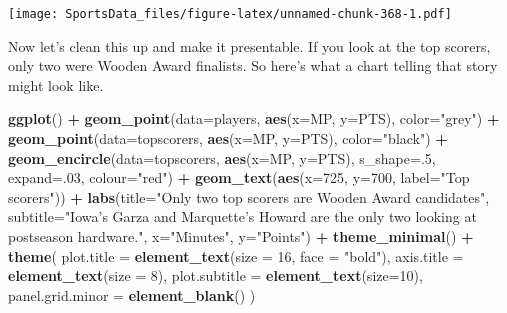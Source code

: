 \documentclass[
]{book}
\newenvironment{Shaded}{\begin{snugshade}}{\end{snugshade}}
\newcommand{\DataTypeTok}[1]{\textcolor[rgb]{0.13,0.29,0.53}{#1}}
\newcommand{\DecValTok}[1]{\textcolor[rgb]{0.00,0.00,0.81}{#1}}
\newcommand{\KeywordTok}[1]{\textcolor[rgb]{0.13,0.29,0.53}{\textbf{#1}}}
\newcommand{\NormalTok}[1]{#1}
\newcommand{\OperatorTok}[1]{\textcolor[rgb]{0.81,0.36,0.00}{\textbf{#1}}}
\newcommand{\StringTok}[1]{\textcolor[rgb]{0.31,0.60,0.02}{#1}}
\begin{document}
\texttt{[image: SportsData\_files/figure-latex/unnamed-chunk-368-1.pdf]}

Now let's clean this up and make it presentable. If you look at the top scorers, only two were Wooden Award finalists. So here's what a chart telling that story might look like.

\begin{Shaded}
\begin{Highlighting}[]
\KeywordTok{ggplot}\NormalTok{() }\OperatorTok{+}\StringTok{ }
\StringTok{  }\KeywordTok{geom_point}\NormalTok{(}\DataTypeTok{data=}\NormalTok{players, }\KeywordTok{aes}\NormalTok{(}\DataTypeTok{x=}\NormalTok{MP, }\DataTypeTok{y=}\NormalTok{PTS), }\DataTypeTok{color=}\StringTok{"grey"}\NormalTok{) }\OperatorTok{+}\StringTok{ }
\StringTok{  }\KeywordTok{geom_point}\NormalTok{(}\DataTypeTok{data=}\NormalTok{topscorers, }\KeywordTok{aes}\NormalTok{(}\DataTypeTok{x=}\NormalTok{MP, }\DataTypeTok{y=}\NormalTok{PTS), }\DataTypeTok{color=}\StringTok{"black"}\NormalTok{) }\OperatorTok{+}\StringTok{ }
\StringTok{  }\KeywordTok{geom_encircle}\NormalTok{(}\DataTypeTok{data=}\NormalTok{topscorers, }\KeywordTok{aes}\NormalTok{(}\DataTypeTok{x=}\NormalTok{MP, }\DataTypeTok{y=}\NormalTok{PTS), }\DataTypeTok{s_shape=}\NormalTok{.}\DecValTok{5}\NormalTok{, }\DataTypeTok{expand=}\NormalTok{.}\DecValTok{03}\NormalTok{, }\DataTypeTok{colour=}\StringTok{"red"}\NormalTok{) }\OperatorTok{+}
\StringTok{  }\KeywordTok{geom_text}\NormalTok{(}\KeywordTok{aes}\NormalTok{(}\DataTypeTok{x=}\DecValTok{725}\NormalTok{, }\DataTypeTok{y=}\DecValTok{700}\NormalTok{, }\DataTypeTok{label=}\StringTok{"Top scorers"}\NormalTok{)) }\OperatorTok{+}\StringTok{ }
\StringTok{  }\KeywordTok{labs}\NormalTok{(}\DataTypeTok{title=}\StringTok{"Only two top scorers are Wooden Award candidates"}\NormalTok{, }\DataTypeTok{subtitle=}\StringTok{"Iowa's Garza and Marquette's Howard are the only two looking at postseason hardware."}\NormalTok{, }\DataTypeTok{x=}\StringTok{"Minutes"}\NormalTok{, }\DataTypeTok{y=}\StringTok{"Points"}\NormalTok{) }\OperatorTok{+}\StringTok{ }
\StringTok{  }\KeywordTok{theme_minimal}\NormalTok{() }\OperatorTok{+}\StringTok{ }
\StringTok{  }\KeywordTok{theme}\NormalTok{(}
    \DataTypeTok{plot.title =} \KeywordTok{element_text}\NormalTok{(}\DataTypeTok{size =} \DecValTok{16}\NormalTok{, }\DataTypeTok{face =} \StringTok{"bold"}\NormalTok{),}
    \DataTypeTok{axis.title =} \KeywordTok{element_text}\NormalTok{(}\DataTypeTok{size =} \DecValTok{8}\NormalTok{), }
    \DataTypeTok{plot.subtitle =} \KeywordTok{element_text}\NormalTok{(}\DataTypeTok{size=}\DecValTok{10}\NormalTok{), }
    \DataTypeTok{panel.grid.minor =} \KeywordTok{element_blank}\NormalTok{()}
\NormalTok{    )}
\end{Highlighting}
\end{Shaded}
\end{document}
